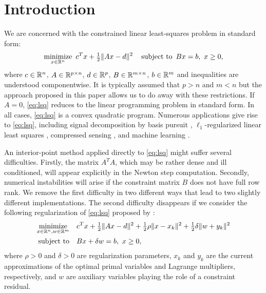 \documentclass{amsart}
\begin{document}
\section{Introduction}

We are concerned with the constrained linear least-squares problem in standard
form:
\begin{equation}
  \label{eq:lsq}
  \displaystyle\mathop{\textup{minimize}}_{x \in \mathbb{R}^n} \ c^T x + \tfrac{1}{2} \|Ax - d\|^2 \quad
  \mathop{\textup{subject to}} \ Bx = b, \ x \geq 0,
\end{equation}
where $c \in \mathbb{R}^n$, $A \in \mathbb{R}^{p \times n}$, $d \in \mathbb{R}^p$, $B \in \mathbb{R}^{m \times
n}$, $b \in \mathbb{R}^m$ and inequalities are understood componentwise. It is
typically assumed that $p > n$ and $m < n$ but the approach proposed in this
paper allows us to do away with these restrictions. If $A = 0$, \eqref{eq:lsq}
reduces to the linear programming problem in standard form. In all cases,
\eqref{eq:lsq} is a convex quadratic program. Numerous applications give rise
to \eqref{eq:lsq}, including signal decomposition by basis pursuit
\citep{chen-donoho-saunders-1998}, $\ell_1$-regularized linear least squares
\citep{kim-koh-lustig-boyd-gorinevsky-2007}, compressed sensing
\citep{donoho-2006},  and machine learning \citep{koh-kim-boyd-2007}.

An interior-point method applied directly to \eqref{eq:lsq} might suffer
several difficulties. Firstly, the matrix $A^T \! A$, which may be rather
dense and ill conditioned, will appear explicitly in the Newton step
computation. Secondly, numerical instabilities will arise if the constraint
matrix $B$ does not have full row rank. We remove the first difficulty in two
different ways that lead to two slightly different implementations. The second
difficulty disappears if we consider the following regularization of
\eqref{eq:lsq} proposed by \cite{friedlander-orban-2012}:
\begin{equation}
  \begin{aligned}
  \label{eq:lsq-reg}
    \displaystyle\mathop{\textup{minimize}}_{x \in \mathbb{R}^n, w \in \mathbb{R}^m} \quad &
                              c^T x + \tfrac{1}{2} \|Ax - d\|^2 +
                              \tfrac{1}{2} \rho \|x - x_k\|^2 +
                              \tfrac{1}{2} \delta \|w + y_k\|^2 \\
    \mathop{\textup{subject to}} \quad & B x + \delta w = b, \ x \geq 0,
  \end{aligned}
\end{equation}
where $\rho > 0$ and $\delta > 0$ are regularization parameters, $x_k$ and
$y_k$ are the current approximations of the optimal primal variables and
Lagrange multipliers, respectively, and $w$ are auxiliary variables playing
the role of a constraint residual.
\end{document}
